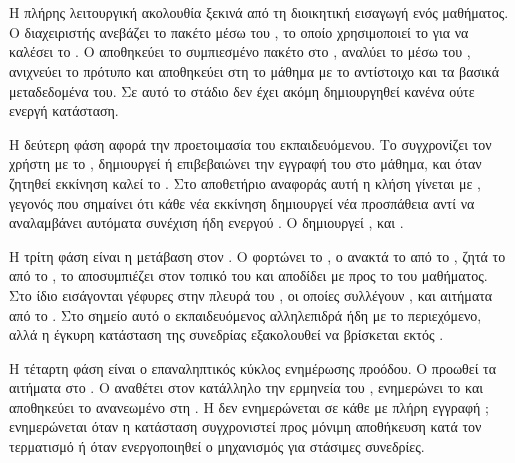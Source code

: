 \section{}
\label{sec:end_to_end_flow}

Η πλήρης λειτουργική ακολουθία ξεκινά από τη διοικητική εισαγωγή ενός μαθήματος. Ο διαχειριστής ανεβάζει το  πακέτο μέσω του , το οποίο χρησιμοποιεί το  για να καλέσει το \texttt{}. Ο  αποθηκεύει το συμπιεσμένο πακέτο στο , αναλύει το \texttt{} μέσω του \texttt{}, ανιχνεύει το πρότυπο και αποθηκεύει στη  το μάθημα με το αντίστοιχο  και τα βασικά μεταδεδομένα του. Σε αυτό το στάδιο δεν έχει ακόμη δημιουργηθεί κανένα  ούτε ενεργή  κατάσταση.

Η δεύτερη φάση αφορά την προετοιμασία του εκπαιδευόμενου. Το  συγχρονίζει τον χρήστη με το , δημιουργεί ή επιβεβαιώνει την εγγραφή του στο μάθημα, και όταν ζητηθεί εκκίνηση καλεί το \texttt{}. Στο αποθετήριο αναφοράς αυτή η κλήση γίνεται με \texttt{}, γεγονός που σημαίνει ότι κάθε νέα εκκίνηση δημιουργεί νέα προσπάθεια αντί να αναλαμβάνει αυτόματα συνέχιση ήδη ενεργού . Ο  δημιουργεί ,  και .

Η τρίτη φάση είναι η μετάβαση στον . Ο  φορτώνει το \texttt{}, ο  ανακτά το  από το , ζητά το  από το , το αποσυμπιέζει στον τοπικό  του και αποδίδει  με  προς το  του μαθήματος. Στο ίδιο  εισάγονται γέφυρες  στην πλευρά του , οι οποίες συλλέγουν ,  και  αιτήματα από το . Στο σημείο αυτό ο εκπαιδευόμενος αλληλεπιδρά ήδη με το περιεχόμενο, αλλά η έγκυρη κατάσταση της συνεδρίας εξακολουθεί να βρίσκεται εκτός .

Η τέταρτη φάση είναι ο επαναληπτικός κύκλος ενημέρωσης προόδου. Ο  προωθεί τα  αιτήματα στο \texttt{}. Ο \texttt{} αναθέτει στον κατάλληλο  την ερμηνεία του , ενημερώνει το \texttt{} και αποθηκεύει το ανανεωμένο  στη . Η  δεν ενημερώνεται σε κάθε  με πλήρη εγγραφή ; ενημερώνεται όταν η κατάσταση συγχρονιστεί προς μόνιμη αποθήκευση κατά τον τερματισμό ή όταν ενεργοποιηθεί ο μηχανισμός για στάσιμες συνεδρίες.

